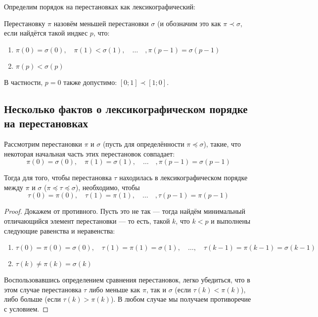 \documentclass[12pt,a4paper,oneside]{article}
\begin{document}
Определим порядок на перестановках как лексикографический:

\begin{definition}
Перестановку $\pi$ назовём меньшей перестановки $\sigma$ (и обозначим это
как $\pi\prec\sigma$, если найдётся такой индкес $p$, что:
\begin{enumerate}
\item $\pi(0) = \sigma(0),\quad\pi(1) < \sigma(1),\quad\dots\quad,\pi(p-1)=\sigma(p-1)$
\item $\pi(p) < \sigma(p)$
\end{enumerate}
\end{definition}

В частности, $p=0$ также допустимо: $[0;1]\prec[1;0]$.

\subsection{Несколько фактов о лексикографическом порядке на перестановках}

\begin{lemma}
Рассмотрим перестановки $\pi$ и $\sigma$ (пусть для определённости $\pi\preceq\sigma$), 
такие, что некоторая начальная часть этих перестановок совпадает:
$$\pi(0) = \sigma(0),\quad \pi(1) =\sigma(1),\quad\dots\quad, \pi(p-1) = \sigma(p-1)$$

Тогда для того, чтобы перестановка $\tau$ находилась в лексикографическом порядке
между $\pi$ и $\sigma$ ($\pi\preceq\tau\preceq\sigma$), необходимо, чтобы 
$$\tau(0) = \pi(0),\quad \tau(1) = \pi(1) ,\quad\dots\quad, \tau(p-1) = \pi(p-1)$$
\end{lemma}

\begin{proof}
Докажем от противного. Пусть это не так --- тогда найдём минимальный
отличающийся элемент перестановки --- то есть, такой $k$, что $k<p$ и выполнены 
следующие равенства и неравенства:
\begin{enumerate}
\item $\tau(0) = \pi(0) = \sigma(0),\quad \tau(1) = \pi(1) =\sigma(1),\quad\dots,\quad \tau(k-1) = \pi(k-1) = \sigma(k-1)$
\item $\tau(k)\ne\pi(k)=\sigma(k)$
\end{enumerate}
Воспользовавшись определением сравнения перестановок, легко убедиться, 
что в этом случае перестановка $\tau$ либо меньше как
$\pi$, так и $\sigma$ (если $\tau(k) < \pi(k)$), либо больше 
(если $\tau(k) > \pi(k)$). В любом случае мы получаем противоречие с условием.
\end{proof}
\end{document}
